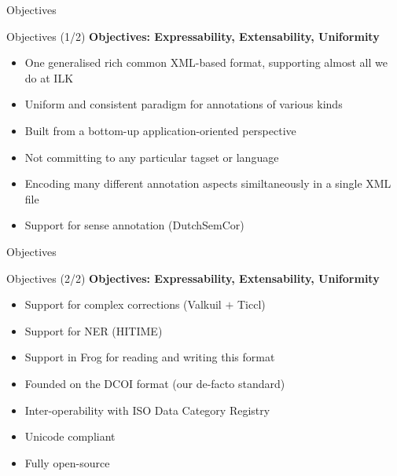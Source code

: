 \documentclass[compress]{beamer}
\begin{document}
\begin{frame}{Objectives}
    \begin{block}{Objectives (1/2)}
        \textbf{Objectives: Expressability, Extensability, Uniformity}
        \begin{itemize}        
            \item One generalised rich common XML-based format, supporting almost all we do at ILK
            \item Uniform and consistent paradigm for annotations of various kinds
            \item Built from a bottom-up application-oriented perspective            
            \item Not committing to any particular tagset or language            
            \item Encoding many different annotation aspects similtaneously in a single XML file
            \item Support for sense annotation (DutchSemCor)
        \end{itemize}        
    \end{block}
\end{frame}
            

\begin{frame}{Objectives}
    \begin{block}{Objectives (2/2)}
        \textbf{Objectives: Expressability, Extensability, Uniformity}
        \begin{itemize}                    
            \item Support for complex corrections (Valkuil $+$ Ticcl)
            \item Support for NER (HITIME)
            \item Support in Frog for reading and writing this format            
            \item Founded on the DCOI format (our de-facto standard)
            \item Inter-operability with ISO Data Category Registry
            \item Unicode compliant
            \item Fully open-source
        \end{itemize}        
    \end{block}
\end{frame}
\end{document}
